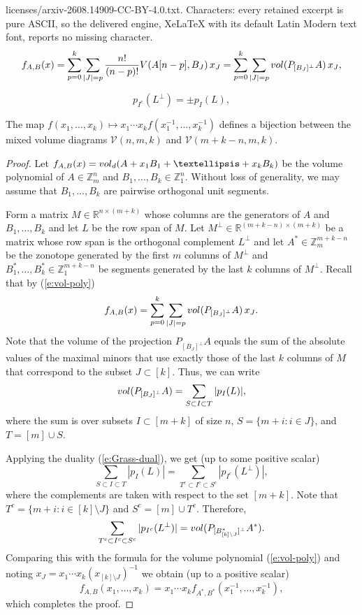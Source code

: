 \documentclass[10pt,a4paper]{amsart}
\def\vol{{\rm vol}}
\newcommand{\R}{\mathbb R}
\newcommand{\Z}{\mathbb Z}
\newcommand{\cV}{\mathcal V}
\begin{document}
licenses/arxiv-2608.14909-CC-BY-4.0.txt. Characters: every retained excerpt is pure ASCII, so the delivered engine, XeLaTeX with its default Latin Modern text font, reports no missing character.
\begin{align}\label{e:vol-poly}
 f_{A,B}(x)= \sum_{p=0}^k\sum_{|J|=p}\frac{n!}{(n-p)!}V(A[n-p],B_J)\,x_{J}=\sum_{p=0}^k\sum_{|J|=p}\vol(P_{[B_{J}]^\perp}A)\,x_{J},
\end{align}

\begin{equation}\label{e:Grass-dual}
p_{I^c}(L^\perp)=\pm p_I(L),   
\end{equation}

\begin{thm}
The map $f(x_1,\dots, x_k)\mapsto x_1\cdots x_k f(x_1^{-1},\dots, x_k^{-1})$ defines a bijection between the
mixed volume diagrams $\cV(n,m,k)$ and $\cV(m+k-n,m,k)$.
\end{thm}

\begin{proof} 
Let $f_{A,B}(x)=\vol_d(A+x_1B_1+\dots+x_kB_k)$ be the volume polynomial of $A\in\Z_m^n$ and $B_1,\dots, B_k\in\Z_1^n$. Without loss of generality, we may assume that $B_1,\dots, B_k$ are pairwise orthogonal unit segments.

Form a matrix $M\in\R^{n\times (m+k)}$ whose columns are the generators of $A$ and $B_1,\dots, B_k$ and let $L$ be the row span of $M$. Let $M^\perp\in\R^{(m+k-n)\times(m+k)}$ be a matrix whose row span is the orthogonal complement $L^\perp$ and let $A^*\in\Z_m^{m+k-n}$ be the zonotope generated by the first $m$ columns of $M^\perp$ and $B^*_1,\dots, B^*_k\in\Z_1^{m+k-n}$ be segments generated by the last $k$ columns of $M^\perp$. Recall that by (\ref{e:vol-poly})
$$
f_{A,B}(x)=\sum_{p=0}^k\sum_{|J|=p}\vol(P_{[B_{J}]^\perp}A)\,x_{J}.
$$
Note that the volume of the projection $P_{[B_{J}]^\perp}A$ equals the sum of the absolute values of the maximal minors that use exactly those of the last $k$ columns of $M$ that correspond to the subset $J\subset[k]$. Thus, we can write
$$
\vol(P_{[B_{J}]^\perp}A) = \sum_{S\subset I\subset T}|p_I(L)|,
$$ 
where the sum is over subsets $I\subset[m+k]$ of size $n$, $S=\{m+i : i\in J\}$, and $T=[m]\cup S$.

Applying the duality (\ref{e:Grass-dual}), we get (up to some positive scalar)
$$
\sum_{S\subset I\subset T}|p_I(L)| = \sum_{T^c\subset I^c\subset S^c}|p_{I^c}(L^\perp)|,
$$
where the complements are taken with respect to the set $[m+k]$. Note that $T^c=\{m+i : i\in [k]\setminus J\}$ and $S^c=[m]\cup T^c$.
Therefore, 
$$
\sum_{T^c\subset I^c\subset S^c}|p_{I^c}(L^\perp)|=\vol(P_{[B^*_{[k]\setminus J}]^\perp}A^*).
$$
Comparing this with the formula for the volume polynomial (\ref{e:vol-poly}) and noting $x_J=x_1\cdots x_k(x_{[k]\setminus J})^{-1}$ we obtain (up to a positive scalar)
$$f_{A,B}(x_1,\dots, x_k)=x_1\cdots x_k f_{A^*,B^*}(x_1^{-1},\dots, x_k^{-1}),$$
which completes the proof.
\end{proof}
\end{document}
